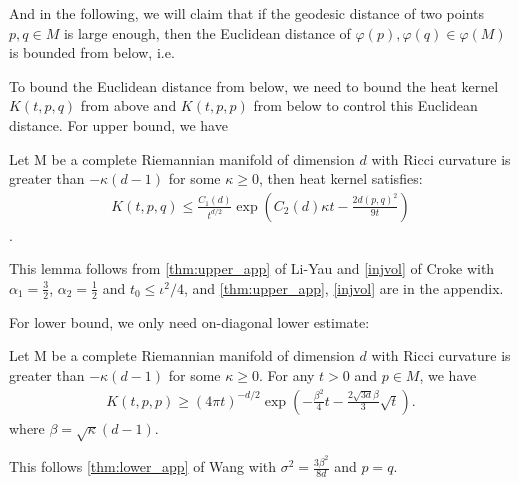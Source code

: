 And in the following, we will claim that if the geodesic distance of two points $p,q \in M$ is large enough, then the Euclidean distance of $\varphi(p), \varphi(q) \in \varphi(M)$ is bounded from below, i.e. 




To bound the Euclidean distance from below, we need to bound the heat kernel $K(t,p,q)$ from above and $K(t,p,p)$ from below to control this Euclidean distance. For upper bound, we have
\begin{lemma}
	\label{thm:upperbound}
	Let M be a complete Riemannian manifold of dimension $d$ with Ricci curvature is greater than $-\kappa(d-1)$ for some $\kappa\geq 0$, then heat kernel satisfies:
	\begin{align}
		K(t,p,q)\leq \frac{C_1(d)}{t^{d/2}}\exp\left(C_2(d)\kappa t - \frac{2d(p,q)^2}{9t}\right)
	\end{align}.
\end{lemma}

This lemma follows from \cref{thm:upper_app} of Li-Yau and \cref{injvol} of Croke with $\alpha_1=\frac{3}{2}$, $\alpha_2=\frac{1}{2}$ and $t_0\leq \iota^2/4$, and \cref{thm:upper_app}, \cref{injvol} are in the appendix.


For lower bound, we only need on-diagonal lower estimate:
\begin{lemma}\cite[Thm. 3.1]{wang1997sharp}
	\label{thm:lowerbound}
	Let M be a complete Riemannian manifold of dimension $d$ with Ricci curvature is greater than $-\kappa(d-1)$ for some $\kappa\geq 0$. For any $t>0$ and $p\in M$, we have
	\begin{align}
		K(t,p,p) \geq (4\pi t)^{-d/2} \exp\left(-\frac{\beta^2}{4}t-\frac{2\sqrt{3d}\beta}{3}\sqrt{t}\right).
	\end{align}
	where $\beta=\sqrt{\kappa}(d-1)$.
\end{lemma}
This follows \cref{thm:lower_app} of Wang with $\sigma^2=\frac{3\beta^2}{8d}$ and $p=q$.



